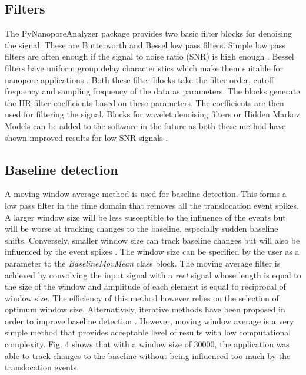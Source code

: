 \documentclass[journal]{IEEEtran}
\begin{document}
\subsection{Filters}
The PyNanoporeAnalyzer package provides two basic filter blocks for denoising the signal. These are Butterworth and Bessel low pass filters. Simple low pass filters are often enough if the signal to noise ratio (SNR) is high enough \cite{plesaDataAnalysisMethods2015,wenGuideSignalProcessing2021}. Bessel filters have uniform group delay characteristics which make them suitable for nanopore applications \cite{colquhounFittingStatisticalAnalysis1983,shekarWaveletDenoisingHighBandwidth2019}. Both these filter blocks take the filter order, cutoff frequency and sampling frequency of the data as parameters. The blocks generate the IIR filter coefficients based on these parameters. The coefficients are then used for filtering the signal. Blocks for wavelet denoising filters or Hidden Markov Models can be added to the software in the future as both these method have shown improved results for low SNR signals \cite{shekarWaveletDenoisingHighBandwidth2019}.

\subsection{Baseline detection}
A moving window average method is used for baseline detection. This forms a low pass filter in the time domain that removes all the translocation event spikes. A larger window size will be less susceptible to the influence of the events but will be worse at tracking changes to the baseline, especially sudden baseline shifts. Conversely, smaller window size can track baseline changes but will also be influenced by the event spikes \cite{smithScientistEngineerGuide1997}. The window size can be specified by the user as a parameter to the \textit{BaselineMovMean} class block. The moving average filter is achieved by convolving the input signal with a \textit{rect} signal whose length is equal to the size of the window and amplitude of each element is equal to reciprocal of window size. The efficiency of this method however relies on the selection of optimum window size. Alternatively, iterative methods have been proposed in order to improve baseline detection \cite{plesaDataAnalysisMethods2015,wenGuideSignalProcessing2021}. However, moving window average is a very simple method that provides acceptable level of results with low computational complexity. Fig. 4 shows that with a window size of 30000, the application was able to track changes to the baseline without being influenced too much by the translocation events. 
\end{document}
